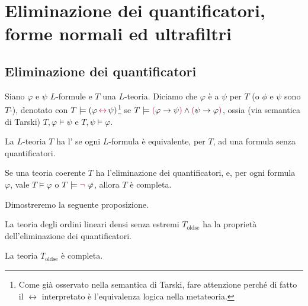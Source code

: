 \section{Eliminazione dei quantificatori, forme normali ed ultrafiltri}
\subsection{Eliminazione dei quantificatori}
\begin{definition}
    Siano $\varphi$ e $\psi$ $L$-formule e $T$ una $L$-teoria. Diciamo che $\varphi$ è  a $\psi$ per $T$ (o $\phi$ e $\psi$ sono $T$-),
    denotato con $T \models (\varphi \,\textcolor{purple}{\leftrightarrow}\, \psi)$\footnote{Come già osservato nella semantica di Tarski, fare attenzione perché di fatto il $\leftrightarrow$ 
    interpretato è l'equivalenza logica nella metateoria.} se $T \models \textcolor{purple}{(} \varphi \rightarrow \psi \textcolor{purple}{)} \land \textcolor{purple}{(} \psi \rightarrow \varphi \textcolor{purple}{)}$,
    ossia (via semantica di Tarski) $T,\varphi \models \psi$ e $T,\psi \models \varphi$.
\end{definition}

\begin{definition}
    La $L$-teoria $T$ ha l' se ogni $L$-formula è equivalente, per $T$,
    ad una formula senza quantificatori.
\end{definition}

\begin{remark}
    Se una teoria coerente $T$ ha l'eliminazione dei quantificatori, e, per ogni formula  $\varphi$, 
vale $T \models \varphi$ o $T \models \textcolor{purple}{\neg\,} \,\varphi$, allora $T$ è completa.
\end{remark}

Dimostreremo la seguente proposizione.

\begin{proposition}
    La teoria degli ordini lineari densi senza estremi $T_{\text{oldse}}$ ha la proprietà dell'eliminazione dei quantificatori.
\end{proposition}

\begin{corollary}
    La teoria $T_{\text{oldse}}$ è completa.
\end{corollary}

